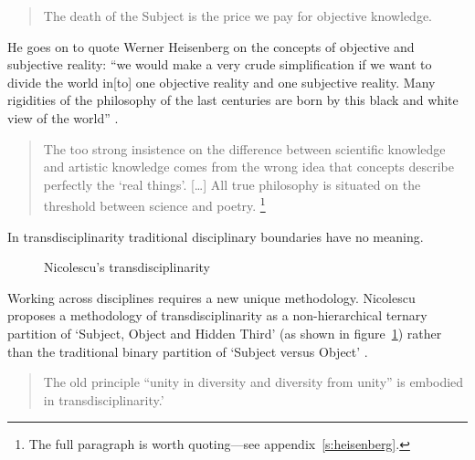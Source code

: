 \begin{quotation}
  The death of the Subject is the price we pay for objective knowledge. 
\end{quotation}

He goes on to quote Werner Heisenberg on the concepts of objective and subjective reality: ``we would make a very crude simplification if we want to divide the world in[to] one objective reality and one subjective reality. Many rigidities of the philosophy of the last centuries are born by this black and white view of the world'' \autocite[Heisenberg, cited in][]{Nicolescu2010}.

\begin{quotation}
  The too strong insistence on the difference between scientific knowledge and artistic knowledge comes from the wrong idea that concepts describe perfectly the `real things'. [\ldots] All true philosophy is situated on the threshold between science and poetry.  \footnote{The full paragraph is worth quoting---see appendix~\ref{s:heisenberg}.}
\end{quotation}

In transdisciplinarity traditional disciplinary boundaries have no meaning.

\begin{figure}[!htbp]
\centering
  \caption[Nicolescu's transdisciplinarity]{Nicolescu's transdisciplinarity}
\label{fig:trans}
\end{figure}

Working across disciplines requires a new unique methodology. Nicolescu proposes a methodology of transdisciplinarity as a non-hierarchical ternary partition of `Subject, Object and Hidden Third' (as shown in figure~\ref{fig:trans}) rather than the traditional binary partition of `Subject versus Object' \autocite*{Nicolescu2010}.

\begin{quotation}
  The old principle ``unity in diversity and diversity from unity'' is embodied in transdisciplinarity.' 
\end{quotation}

